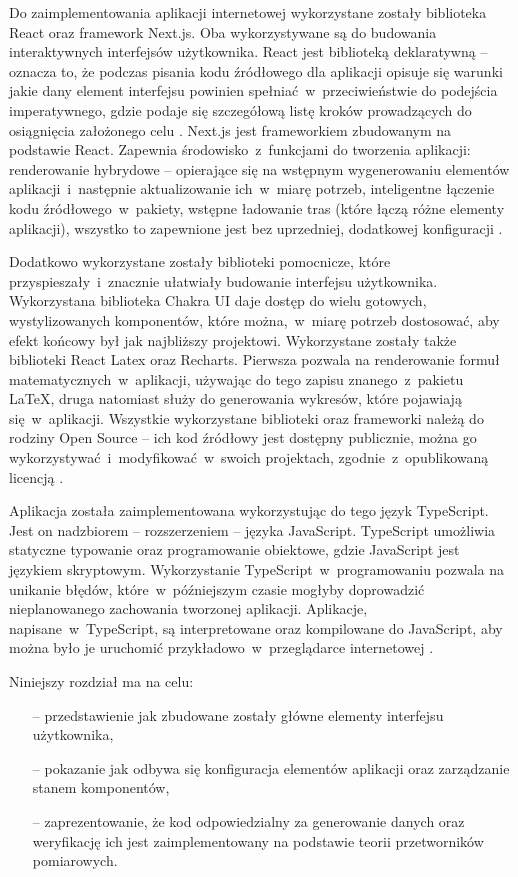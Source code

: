Do zaimplementowania aplikacji internetowej wykorzystane zostały biblioteka React oraz framework
Next.js. Oba wykorzystywane są do budowania interaktywnych interfejsów użytkownika. React jest
biblioteką deklaratywną -- oznacza to, że podczas pisania kodu źródłowego dla aplikacji opisuje się
warunki jakie dany element interfejsu powinien spełniać~w~przeciwieństwie do podejścia
imperatywnego, gdzie podaje się szczegółową listę kroków prowadzących do osiągnięcia założonego celu
\cite{react-main}. Next.js jest frameworkiem zbudowanym na podstawie React.
Zapewnia środowisko~z~funkcjami do tworzenia aplikacji: renderowanie hybrydowe -- opierające się na
wstępnym wygenerowaniu elementów aplikacji~i~następnie aktualizowanie ich~w~miarę potrzeb,
inteligentne łączenie kodu źródłowego~w~pakiety, wstępne ładowanie tras (które łączą różne elementy
aplikacji), wszystko to zapewnione jest bez uprzedniej, dodatkowej konfiguracji \cite{nextjs-main}.

Dodatkowo wykorzystane zostały biblioteki pomocnicze, które przyspieszały~i~znacznie
ułatwiały budowanie interfejsu użytkownika. Wykorzystana biblioteka Chakra UI daje dostęp do wielu
gotowych, wystylizowanych komponentów, które można,~w~miarę potrzeb dostosować, aby efekt końcowy
był jak najbliższy projektowi. Wykorzystane zostały także biblioteki React Latex oraz Recharts.
Pierwsza pozwala na renderowanie formuł matematycznych~w~aplikacji, używając do tego zapisu
znanego~z~pakietu LaTeX, druga natomiast służy do generowania wykresów, które pojawiają
się~w~aplikacji. Wszystkie wykorzystane biblioteki oraz frameworki należą do rodziny Open Source --
ich kod źródłowy jest dostępny publicznie, można go wykorzystywać~i~modyfikować~w~swoich
projektach, zgodnie~z~opublikowaną licencją \cite{snyk-licences, snyk-mit}.

Aplikacja została zaimplementowana wykorzystując do tego język TypeScript. Jest on nadzbiorem --
rozszerzeniem -- języka JavaScript. TypeScript umożliwia statyczne typowanie oraz programowanie
obiektowe, gdzie JavaScript jest językiem skryptowym. Wykorzystanie TypeScript~w~programowaniu
pozwala na unikanie błędów, które~w~późniejszym czasie mogłyby doprowadzić nieplanowanego
zachowania tworzonej aplikacji. Aplikacje, napisane~w~TypeScript, są interpretowane oraz
kompilowane do JavaScript, aby można było je uruchomić przykładowo~w~przeglądarce
internetowej \cite{ts-main}.

Niniejszy rozdział ma na celu:
\begin{itemize}
  \item[--] przedstawienie jak zbudowane zostały główne elementy interfejsu użytkownika,
  \item[--] pokazanie jak odbywa się konfiguracja elementów aplikacji oraz zarządzanie stanem
        komponentów,
  \item[--] zaprezentowanie, że kod odpowiedzialny za generowanie danych oraz weryfikację ich
        jest zaimplementowany na podstawie teorii przetworników pomiarowych.
\end{itemize}

